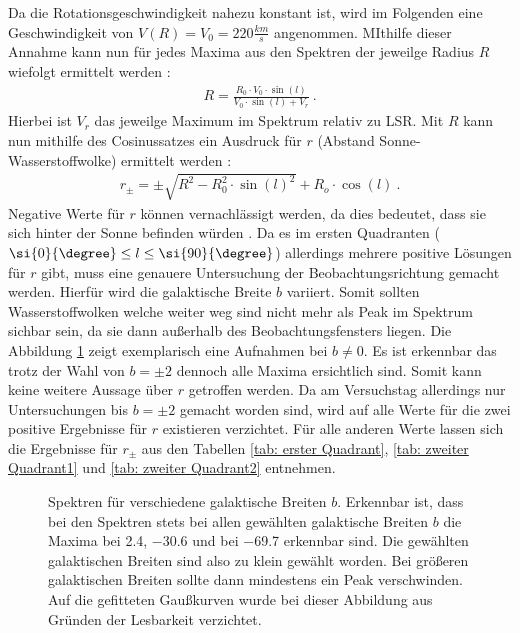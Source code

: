 Da die Rotationsgeschwindigkeit nahezu konstant ist, wird im Folgenden eine Geschwindigkeit von $V(R) = V_0 = \si{220}{\frac{km}{s}}$ angenommen. MIthilfe dieser Annahme kann nun für jedes Maxima aus den Spektren der jeweilge Radius $R$ wiefolgt ermittelt werden \cite{H1}:
\begin{align}
    R =\frac{R_0 \cdot V_0 \cdot \sin(l)}{V_0 \cdot \sin(l) + V_r} \ .
    \label{eq:BerechnungR}
\end{align}
Hierbei ist $V_r$ das jeweilge Maximum im Spektrum relativ zu LSR.\newline
Mit $R$ kann nun mithilfe des Cosinussatzes ein Ausdruck für $r$ (Abstand Sonne-Wasserstoffwolke) ermittelt werden \cite{H1}:
\begin{align}
    r_{\pm} = \pm \sqrt{R^2 - R_0^2 \cdot \sin(l)^2} + R_o \cdot \cos(l) \ .
    \label{eq:Berechnungr}
\end{align}
Negative Werte für $r$ können vernachlässigt werden, da dies bedeutet, dass sie sich hinter der Sonne befinden würden \cite{H1}. Da es im ersten Quadranten ($ \si{0}{\degree} \le l \le \si{90}{\degree}$) allerdings mehrere positive Lösungen für $r$ gibt, muss eine genauere Untersuchung der Beobachtungsrichtung gemacht werden. Hierfür wird die galaktische Breite $b$ variiert. Somit sollten Wasserstoffwolken welche weiter weg sind nicht mehr als Peak im Spektrum sichbar sein, da sie dann außerhalb des Beobachtungsfensters liegen. Die Abbildung \ref{fig:bungleichnull} zeigt exemplarisch eine Aufnahmen bei $b \neq 0$. Es ist erkennbar das trotz der Wahl von $b = \pm 2$ dennoch alle Maxima ersichtlich sind. Somit kann keine weitere Aussage über $r$ getroffen werden. Da am Versuchstag allerdings nur Untersuchungen bis $b = \pm 2$ gemacht worden sind, wird auf alle Werte für die zwei positive Ergebnisse für $r$ existieren verzichtet. Für alle anderen Werte lassen sich die Ergebnisse für $r_{\pm}$ aus den Tabellen \ref{tab: erster Quadrant}, \ref{tab: zweiter Quadrant1} und \ref{tab: zweiter Quadrant2} entnehmen.
\begin{figure}[H]
    \centering
       
    \caption[Spektren für verschiedene galaktische Breiten $b$]{Spektren für verschiedene galaktische Breiten $b$. Erkennbar ist, dass bei den Spektren stets bei allen gewählten galaktische Breiten $b$ die Maxima bei \SI{2.4}{}, \SI{-30.6}{} und bei \SI{-69.7}{} erkennbar sind. Die gewählten galaktischen Breiten sind also zu klein gewählt worden. Bei größeren galaktischen Breiten sollte dann mindestens ein Peak verschwinden. Auf die gefitteten Gaußkurven wurde bei dieser Abbildung aus Gründen der Lesbarkeit verzichtet.}
    \label{fig:bungleichnull}
\end{figure}
